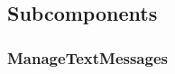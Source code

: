 \subsection{Subcomponents}\label{s:ManageDMIOutput_subcomponents}


\subsubsection{ManageTextMessages}

